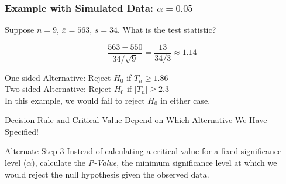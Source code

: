 \documentclass[handout]{beamer}
\begin{document}
\begin{frame}
\frametitle{Example with Simulated Data: $\alpha = 0.05$}
Suppose $n=9$, $\bar{x} = 563$, $s = 34$. What is the test statistic?


\vspace{1em}
	$$\frac{563 - 550}{34/\sqrt{9}}= \frac{13}{34/3} \approx 1.14$$



One-sided Alternative: Reject $H_0$ if $T_n\geq 1.86$\\
Two-sided Alternative: Reject $H_0$ if $\left|T_n\right| \geq 2.3$\\

\vspace{1em}
\alert{In this example, we would fail to reject $H_0$ in either case.}
\end{frame}
\begin{frame}
\begin{center}
\huge Decision Rule and Critical Value Depend on Which Alternative We Have Specified!
\end{center}
\end{frame}


\begin{frame}
\begin{alertblock}{Alternate Step 3}
Instead of calculating a critical value for a fixed significance level ($\alpha$), calculate the \emph{P-Value}, the minimum significance level at which we would reject the null hypothesis given the observed data.
\end{alertblock}


\end{frame}
\end{document}
